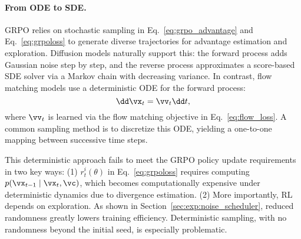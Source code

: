 \paragraph{From ODE to SDE.}
GRPO relies on stochastic sampling in Eq.~\ref{eq:grpo_advantage} and Eq.~\ref{eq:grpoloss} to generate diverse trajectories for advantage estimation and exploration. Diffusion models naturally support this: the forward process adds Gaussian noise step by step, and the reverse process approximates a score-based SDE solver via a Markov chain with decreasing variance.
In contrast, flow matching models use a deterministic ODE for the forward process:
\begin{equation}
    \dd\vx_t = \vv_t \dd t,
    \label{eq:ode}
\end{equation}
where $\vv_t$ is learned via the flow matching objective in Eq.~\ref{eq:flow_loss}. A common sampling method is to discretize this ODE, yielding a one-to-one mapping between successive time steps. 

This deterministic approach fails to meet the GRPO policy update requirements in two key ways:
(1) $r^i_t(\theta)$ in Eq.~\ref{eq:grpoloss} requires computing $p(\vx_{t-1} \mid \vx_t, \vc)$, which becomes computationally expensive under deterministic dynamics due to divergence estimation.
(2) More importantly, RL depends on exploration. As shown in Section~\ref{sec:exp:noise_scheduler}, reduced randomness greatly lowers training efficiency. Deterministic sampling, with no randomness beyond the initial seed, is especially problematic.

